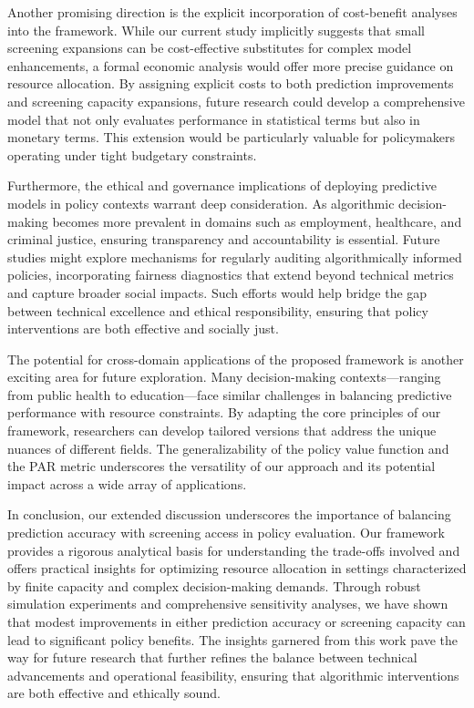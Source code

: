 \documentclass{article}
\begin{document}
Another promising direction is the explicit incorporation of cost-benefit analyses into the framework. While our current study implicitly suggests that small screening expansions can be cost-effective substitutes for complex model enhancements, a formal economic analysis would offer more precise guidance on resource allocation. By assigning explicit costs to both prediction improvements and screening capacity expansions, future research could develop a comprehensive model that not only evaluates performance in statistical terms but also in monetary terms. This extension would be particularly valuable for policymakers operating under tight budgetary constraints.

Furthermore, the ethical and governance implications of deploying predictive models in policy contexts warrant deep consideration. As algorithmic decision-making becomes more prevalent in domains such as employment, healthcare, and criminal justice, ensuring transparency and accountability is essential. Future studies might explore mechanisms for regularly auditing algorithmically informed policies, incorporating fairness diagnostics that extend beyond technical metrics and capture broader social impacts. Such efforts would help bridge the gap between technical excellence and ethical responsibility, ensuring that policy interventions are both effective and socially just.

The potential for cross-domain applications of the proposed framework is another exciting area for future exploration. Many decision-making contexts—ranging from public health to education—face similar challenges in balancing predictive performance with resource constraints. By adapting the core principles of our framework, researchers can develop tailored versions that address the unique nuances of different fields. The generalizability of the policy value function and the PAR metric underscores the versatility of our approach and its potential impact across a wide array of applications.

In conclusion, our extended discussion underscores the importance of balancing prediction accuracy with screening access in policy evaluation. Our framework provides a rigorous analytical basis for understanding the trade-offs involved and offers practical insights for optimizing resource allocation in settings characterized by finite capacity and complex decision-making demands. Through robust simulation experiments and comprehensive sensitivity analyses, we have shown that modest improvements in either prediction accuracy or screening capacity can lead to significant policy benefits. The insights garnered from this work pave the way for future research that further refines the balance between technical advancements and operational feasibility, ensuring that algorithmic interventions are both effective and ethically sound.
\end{document}
